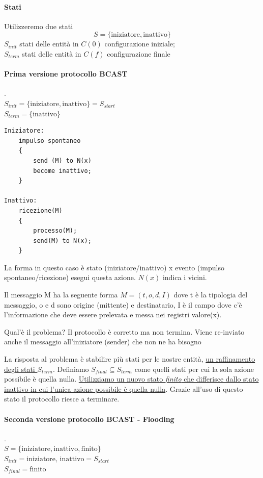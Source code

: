 \paragraph{Stati}
Utilizzeremo due stati
$$S = \{\text{iniziatore}, \text{inattivo}\}$$
$S_{init}$ stati delle entità in $C(0)$ configurazione iniziale;\\$S_{term}$ stati delle entità in $C(f)$ configurazione finale

\paragraph{Prima versione protocollo BCAST}
.\\$S_{init} = \{\text{iniziatore}, \text{inattivo}\} = S_{start}$\\
$S_{term} = \{\text{inattivo}\}$

\begin{lstlisting}
Iniziatore:
    impulso spontaneo
    {
        send (M) to N(x)
        become inattivo;
    }

Inattivo:
    ricezione(M)
    {
        processo(M);
        send(M) to N(x);
    }
\end{lstlisting}
La forma in questo caso è stato (iniziatore/inattivo) x evento (impulso spontaneo/ricezione) esegui questa azione. $N(x)$ indica i vicini.

Il messaggio M ha la seguente forma $M = (t, o, d, I)$ dove t è la tipologia del messaggio, o e d sono origine (mittente) e destinatario, I è il campo dove c'è l'informazione che deve essere prelevata e messa nei registri valore(x).

Qual'è il problema? Il protocollo è corretto ma non termina. Viene re-inviato anche il messaggio all'iniziatore (sender) che non ne ha bisogno

La risposta al problema è stabilire più stati per le nostre entità, \uline{un raffinamento degli stati $S_{term}$}. Definiamo $S_{final} \subseteq S_{term}$ come quelli stati per cui la sola azione possibile è quella nulla. \uline{Utilizziamo un nuovo stato \textit{finito} che differisce dallo stato inattivo in cui l'unica azione possibile è quella nulla}. Grazie all'uso di questo stato il protocollo riesce a terminare.

\paragraph{Seconda versione protocollo BCAST - Flooding}
.\\$S = \{\text{iniziatore}, \text{inattivo}, \text{finito}\}$\\
$S_{init} = \text{iniziatore, inattivo} = S_{start}$\\
$S_{final} = \text{finito}$


